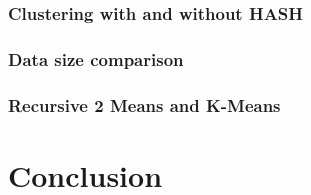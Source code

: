 \documentclass[runningheads,a4paper]{llncs}
\begin{document}
\subsubsection{Clustering with and without HASH}
\subsubsection{Data size comparison}
\subsubsection{Recursive 2 Means and K-Means}

\section{Conclusion}\label{sec-con}



\end{document}
